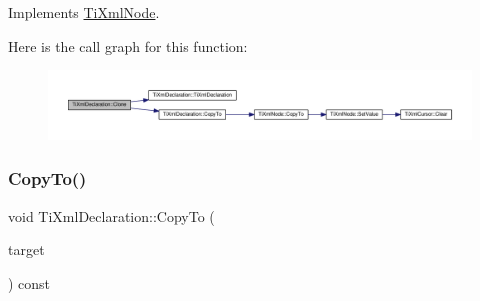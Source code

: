 Implements \hyperlink{class_ti_xml_node_a4508cc3a2d7a98e96a54cc09c37a78a4}{Ti\+Xml\+Node}.

Here is the call graph for this function\+:\nopagebreak
\begin{figure}[H]
\begin{center}
\leavevmode
\includegraphics[width=350pt]{class_ti_xml_declaration_a35dc1455f69b79e81cae28e186944610_cgraph}
\end{center}
\end{figure}
\mbox{\label{class_ti_xml_declaration_a189de17b3e04d4e5b1c385336f214af1}} 
\subsubsection{\texorpdfstring{Copy\+To()}{CopyTo()}}
{\footnotesize\ttfamily void Ti\+Xml\+Declaration\+::\+Copy\+To (\begin{DoxyParamCaption}\item[{\hyperlink{class_ti_xml_declaration}{Ti\+Xml\+Declaration} $\ast$}]{target }\end{DoxyParamCaption}) const\hspace{0.3cm}{\ttfamily [protected]}}

